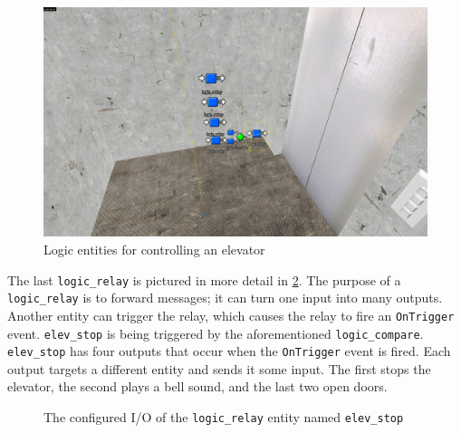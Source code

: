 \documentclass[a4paper, 12pt]{scrartcl}
\begin{document}
\begin{figure}[!htp]
  \centering
  \includegraphics[width=0.75\linewidth]{images/source_io_entities.png}
  \caption{Logic entities for controlling an elevator}
  \label{fig:source_entities}
\end{figure}

The last \texttt{logic\_relay} is pictured in more detail in \cref{fig:source_elev_stop}. The purpose of a \texttt{logic\_relay} is to forward messages; it can turn one input into many outputs. Another entity can trigger the relay, which causes the relay to fire an \texttt{OnTrigger} event. \texttt{elev\_stop} is being triggered by the aforementioned \texttt{logic\_compare}. \texttt{elev\_stop} has four outputs that occur when the \texttt{OnTrigger} event is fired. Each output targets a different entity and sends it some input. The first stops the elevator, the second plays a bell sound, and the last two open doors.

\begin{figure}[!htp]
  \centering
  \qquad
  \caption{The configured I/O of the \texttt{logic\_relay} entity named \texttt{elev\_stop}}
  \label{fig:source_elev_stop}
\end{figure}
\end{document}
